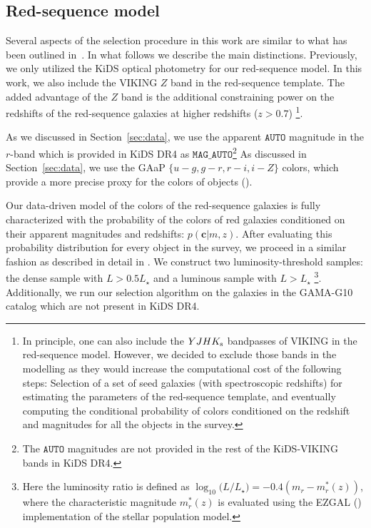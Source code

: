 \documentclass[fleqn,usenatbib,useAMS]{mnras}
\begin{document}
\subsection{Red-sequence model}

Several aspects of the selection procedure in this work are similar to what has been outlined  in~\citet{vakili2019}. In what follows we describe the main distinctions. Previously, we only utilized the KiDS optical photometry for our red-sequence model. In this work, we also include the VIKING $Z$ band in the red-sequence template.
The added advantage of the $Z$ band is the additional constraining power on the redshifts of the red-sequence galaxies at higher redshifts ($z>0.7$)
\footnote{In principle, one can also include the $YJHK_{\rm s}$ bandpasses of VIKING in the red-sequence model. However, we decided to exclude those bands in the modelling as they would increase the computational cost of the following steps: Selection of a set of seed galaxies (with spectroscopic redshifts) for estimating the parameters of the red-sequence template, and eventually computing the conditional probability of colors conditioned on the redshift and magnitudes for all the objects in the survey.}.

As we discussed in Section~\ref{sec:data}, we use the apparent $\mathtt{AUTO}$ magnitude in the $r$-band which is provided in KiDS DR4 as $\mathtt{MAG\_AUTO}$\footnote{The $\mathtt{AUTO}$ magnitudes are not provided in the rest of the KiDS-VIKING bands in KiDS DR4.} As discussed in Section~\ref{sec:data}, we use the GAaP $\{u-g,g-r,r-i,i-Z\}$ colors, which provide a more precise proxy for the colors of objects (\citealt{kuijken2019}). 

Our data-driven model of the colors of the red-sequence galaxies is fully characterized with the probability of the colors of red galaxies conditioned on their apparent magnitudes and redshifts: $p(\boldsymbol{c}|m,z)$. After evaluating this probability distribution for every object in the survey, we proceed in a similar fashion as described in detail in \citet{rozo2016, vakili2019}. We construct two luminosity-threshold samples: the dense sample with $L>0.5 L_{\star}$ and a luminous sample with $L>L_{\star}$ \footnote{Here the luminosity ratio is defined as $\log_{10}\big(L/L_{\star}\big) = -0.4(m_{r} - m_{r}^{*}(z))$, where the characteristic magnitude $m_{r}^{*}(z)$ is evaluated using the EZGAL (\citealt{ezgal_paper}) implementation of the \citet{bc03} stellar population model.}. Additionally, we run our selection algorithm on the galaxies in the GAMA-G10 catalog which are not present in KiDS DR4.
\end{document}

